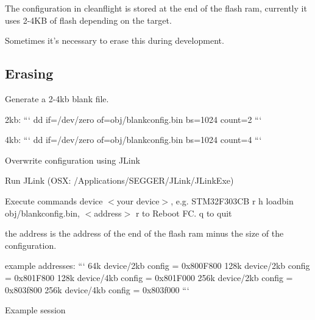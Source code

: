 The configuration in cleanflight is stored at the end of the flash ram, currently it uses 2-\/4\+K\+B of flash depending on the target.

Sometimes it's necessary to erase this during development.

\subsection*{Erasing}

Generate a 2-\/4kb blank file.

2kb\+: ``` dd if=/dev/zero of=obj/blankconfig.\+bin bs=1024 count=2 ```

4kb\+: ``` dd if=/dev/zero of=obj/blankconfig.\+bin bs=1024 count=4 ```

Overwrite configuration using J\+Link

Run J\+Link (O\+S\+X\+: {\ttfamily /\+Applications/\+S\+E\+G\+G\+E\+R/\+J\+Link/\+J\+Link\+Exe})

Execute commands {\ttfamily device $<$your device$>$}, e.\+g. {\ttfamily S\+T\+M32\+F303\+C\+B} {\ttfamily r} {\ttfamily h} {\ttfamily loadbin obj/blankconfig.\+bin, $<$address$>$} {\ttfamily r} to Reboot F\+C. {\ttfamily q} to quit

the address is the address of the end of the flash ram minus the size of the configuration.

example addresses\+: ``` 64k device/2kb config = 0x800\+F800 128k device/2kb config = 0x801\+F800 128k device/4kb config = 0x801\+F000 256k device/2kb config = 0x803f800 256k device/4kb config = 0x803f000 ```

Example session

